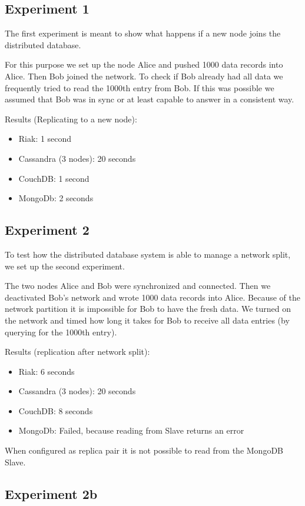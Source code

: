 \subsection{Experiment 1}

The first experiment is meant to show what happens if a new node
joins the distributed database.

For this purpose we set up the node Alice and pushed 1000 data
records into Alice. Then Bob joined the network. To check if Bob
already had all data we frequently tried to read the 1000th entry
from Bob. If this was possible we assumed that Bob was in sync or
at least capable to answer in a consistent way.

Results (Replicating to a new node):

\begin{itemize}
\item
  Riak: 1 second
\item
  Cassandra (3 nodes): 20 seconds
\item
  CouchDB: 1 second
\item
  MongoDb: 2 seconds
\end{itemize}
\subsection{Experiment 2}

To test how the distributed database system is able to manage a
network split, we set up the second experiment.

The two nodes Alice and Bob were synchronized and connected. Then
we deactivated Bob's network and wrote 1000 data records into
Alice. Because of the network partition it is impossible for Bob to
have the fresh data. We turned on the network and timed how long it
takes for Bob to receive all data entries (by querying for the
1000th entry).

Results (replication after network split):

\begin{itemize}
\item
  Riak: 6 seconds
\item
  Cassandra (3 nodes): 20 seconds
\item
  CouchDB: 8 seconds
\item
  MongoDb: Failed, because reading from Slave returns an error
\end{itemize}
When configured as replica pair it is not possible to read from the
MongoDB Slave.

\subsection{Experiment 2b}


